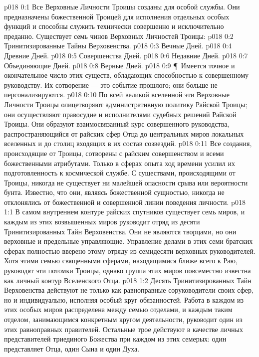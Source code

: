 \vs p018 0:1 Все Верховные Личности Троицы созданы для особой службы. Они предназначены божественной Троицей для исполнения отдельных особых функций и способны служить технически совершенно и исключительно преданно. Существует семь чинов Верховных Личностей Троицы:
\vs p018 0:2 \bibnobreakspace Тринитизированные Тайны Верховенства.
\vs p018 0:3 \bibnobreakspace Вечные Дней.
\vs p018 0:4 \bibnobreakspace Древние Дней.
\vs p018 0:5 \bibnobreakspace Совершенства Дней.
\vs p018 0:6 \bibnobreakspace Недавние Дней.
\vs p018 0:7 \bibnobreakspace Объединяющие Дней.
\vs p018 0:8 \bibnobreakspace Верные Дней.
\vs p018 0:9 \P\ Имеется точное и окончательное число этих существ, обладающих способностью к совершенному руководству. Их сотворение --- это событие прошлого; они больше не персонализируются.
\vs p018 0:10 По всей великой вселенной эти Верховные Личности Троицы олицетворяют административную политику Райской Троицы; они осуществляют правосудие и  исполнителями судебных решений Райской Троицы. Они образуют взаимосвязанный курс совершенного руководства, распространяющийся от райских сфер Отца до центральных миров локальных вселенных и до столиц входящих в их состав созвездий.
\vs p018 0:11 Все создания, происходящие от Троицы, сотворены с райским совершенством и всеми божественными атрибутами. Только в сферах опыта ход времени усилил их подготовленность к космической службе. С существами, происходящими от Троицы, никогда не существует ни малейшей опасности срыва или вероятности бунта. Известно, что они, являясь божественной сущностью, никогда не отклонялись от божественной и совершенной линии поведения личности.
\vs p018 1:1 В самом внутреннем контуре райских спутников существует семь миров, и каждым из этих возвышенных миров руководит отряд из десяти Тринитизированных Тайн Верховенства. Они не являются творцами, но они верховные и предельные управляющие. Управление делами в этих семи братских сферах полностью вверено этому отряду из семидесяти верховных руководителей. Хотя этими семью священными сферами, находящимися ближе всего к Раю, руководят эти потомки Троицы, однако группа этих миров повсеместно известна как личный контур Вселенского Отца.
\vs p018 1:2 Десять Тринитизированных Тайн Верховенства действуют не только как равноправные соруководители своих сфер, но и индивидуально, исполняя особый круг обязанностей. Работа в каждом из этих особых миров распределена между семью отделами, и каждым таким отделом, занимающимся конкретным кругом деятельности, руководит один из этих равноправных правителей. Остальные трое действуют в качестве личных представителей триединого Божества при каждом из этих семерых: один представляет Отца, один Сына и один Духа.
